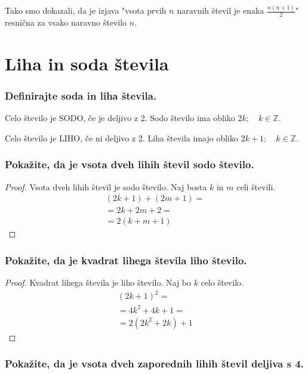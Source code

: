 \documentclass{article}
\begin{document}
Tako smo dokazali, da je izjava "vsota prvih $n$ naravnih števil je enaka $\frac{n(n+1)}{2}$" resnična za vsako naravno število $n$.

\section{Liha in soda števila}

\subsubsection*{Definirajte soda in liha števila.}

Celo število je SODO, če je deljivo z 2. Sodo število ima obliko $2k; \quad k \in \mathbb{Z}$.

Celo število je LIHO, če ni deljivo z 2. Liha števila imajo obliko $2k + 1; \quad k \in \mathbb{Z}$.

\subsubsection*{Pokažite, da je vsota dveh lihih števil sodo število.}

\begin{proof}
Vsota dveh lihih števil je sodo število.
Naj bosta $k$ in $m$ celi števili.
\begin{gather*}
    (2k + 1) + (2m + 1) = \\
    = 2k + 2m + 2 = \\
    = 2 (k + m + 1)
\end{gather*}
\end{proof}

\subsubsection*{Pokažite, da je kvadrat lihega števila liho število.}

\begin{proof}
Kvadrat lihega števila je liho število.
Naj bo $k$ celo število. 
\begin{gather*}
    (2k + 1)^2 = \\
    = 4k^2 + 4k + 1 = \\
    = 2 (2k^2 + 2k) + 1
\end{gather*}
\end{proof}

\subsubsection*{Pokažite, da je vsota dveh zaporednih lihih števil deljiva s 4.}
\end{document}
